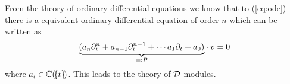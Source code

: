 From the theory of ordinary differential equations we know that to
(\ref{eq:ode}) there is a equivalent ordinary differential equation of order
$n$ which can be written as
\[
  \underset{=:P}{\underbrace{%
      (a_n\partial_t^n+a_{n-1}\partial_t^{n-1}+\cdots a_{1}\partial_t+a_{0})
  }} \cdot v=0
\]
where $a_i\in\mathbb{C}(\!\{t\}\!)$.
This leads to the theory of $\mathcal{D}$-modules.

\begin{comment}
  See \cite[Sec.1.4]{babbitt1983} for \textbf{ode of rank $n$} to
  \textbf{system}.
\end{comment}

\begin{comment}
\subsubsection{As $\cD$-module}
\marginnote{\cite[Sec.4.2.2]{Loday2014}}

In the other direction, from $\cD$-modules to meromorphic connections, there is
the lemma of the cyclic vector. \TODO{}
\marginnote{\textbf{\cite[Prop.4.2.5]{Loday2014}},
  \cite[Rem.4.2.6]{Loday2014}}
\end{comment}

